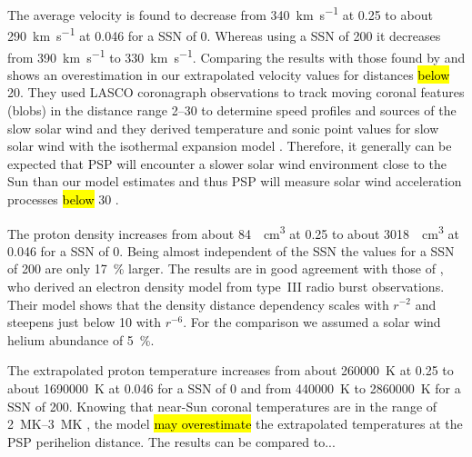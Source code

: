 The average velocity is found to decrease from \SI{340}{\km\per\s} at \SI{0.25}{\au} to about \SI{290}{\km\per\s} at \SI{0.046}{\au} for a SSN of 0. Whereas using a SSN of 200 it decreases from \SI{390}{\km\per\s} to \SI{330}{\km\per\s}. Comparing the results with those found by \citet{Sheeley1997} and \citet{Wang2000} shows an overestimation in our extrapolated velocity values for distances \hl{below} \SI{20}{\Rs}. They used LASCO coronagraph observations to track moving coronal features (blobs) in the distance range \SIrange{2}{30}{\Rs} to determine speed profiles and sources of the slow solar wind and they derived temperature and sonic point values for slow solar wind with the isothermal expansion model \citep{Parker1958}. Therefore, it generally can be expected that PSP will encounter a slower solar wind environment close to the Sun than our model estimates and thus PSP will measure solar wind acceleration processes \hl{below} \SI{30}{\Rs} \citep{Sheeley1997,McComas2008}.

The proton density increases from about \SI{84}{\per\cm\cubed} at  \SI{0.25}{\au} to about \SI{3018}{\per\cm\cubed} at \SI{0.046}{\au} for a SSN of 0. Being almost independent of the SSN the values for a SSN of 200 are only \SI{17}{\%} larger. The results are in good agreement with those of \citet{Leblanc1998}, who derived an electron density model from type~III radio burst observations. Their model shows that the density distance dependency scales with $r^{-2}$ and steepens just below \SI{10}{\Rs} with $r^{-6}$. For the comparison we assumed a solar wind helium abundance of \SI{5}{\%}.

The extrapolated proton temperature increases from about \SI{260000}{\K} at \SI{0.25}{\au} to about \SI{1690000}{\K} at \SI{0.046}{\au} for a SSN of 0 and from \SI{440000}{\K} to \SI{2860000}{\K} for a SSN of 200. Knowing that near-Sun coronal temperatures are in the range of \SIrange{2}{3}{\mega\K} \citep{Billings1959,Liebenberg1975}, the model \hl{may overestimate} the extrapolated temperatures at the PSP perihelion distance. {\color{red} The results can be compared to...}

